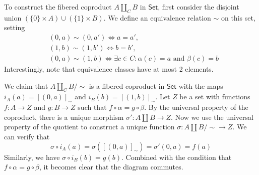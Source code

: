 \documentclass[../../master.tex]{subfiles}
\begin{document}
\begin{solution}
      To construct the fibered coproduct \(A \coprod_{C} B\) in \(\mathsf{Set}\),
      first consider the disjoint union \((\{0\} \times A) \cup (\{1\} \times B)\).
      We define an equivalence relation \(\sim\) on this set, setting
      \begin{align*}
        &(0, a) \sim (0, a') \Longleftrightarrow a = a', \\
        &(1, b) \sim (1, b') \Longleftrightarrow b = b', \\
        &(0, a) \sim (1, b) \Longleftrightarrow \exists c \in C: \alpha(c) = a \text{ and } \beta(c) = b
      \end{align*}
      Interestingly, note that equivalence classes have at most 2 elements.

      We claim that \(A \coprod_{C} B / {\sim}\) is a fibered coproduct in \(\mathsf{Set}\) with the maps \(i_{A}(a) = [(0, a)]_{\sim}\) and \(i_{B}(b) = [(1, b)]_{\sim}\).
      Let \(Z\) be a set with functions \(f: A \to Z\) and \(g: B \to Z\) such that \(f \circ \alpha = g \circ \beta\).
      By the universal property of the coproduct, there is a unique morphism \(\sigma': A \coprod B \to Z\).
      Now we use the universal property of the quotient to construct a unique function \(\sigma: A \coprod B / {\sim} \to Z\).
      We can verify that
      \begin{equation*}
        \sigma \circ i_{A}(a) = \sigma([(0, a)]_{\sim}) = \sigma'(0, a) = f(a)
      \end{equation*}
      Similarly, we have \(\sigma \circ i_{B}(b) = g(b)\).
      Combined with the condition that \(f \circ \alpha = g \circ \beta\), it becomes clear that the diagram commutes.
    \end{solution}
\end{document}
